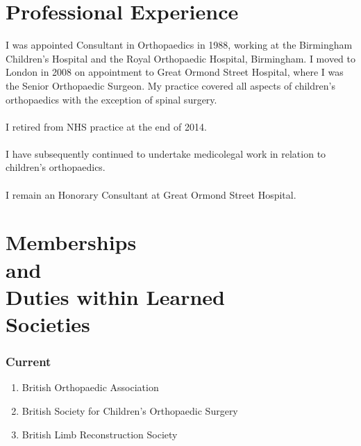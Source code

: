 \documentclass[margin,line]{res}
\begin{document}
\begin{resume}
\section{\sc Professional Experience}
\noindent{}I was appointed Consultant in Orthopaedics in 1988, working at the Birmingham Children's Hospital and the Royal Orthopaedic Hospital, Birmingham. I  moved  to  London  in  2008  on appointment to  Great  Ormond  Street Hospital, where  I was the Senior Orthopaedic  Surgeon. My practice  covered  all aspects  of children's orthopaedics with the exception of spinal surgery.\\
\\
I retired from NHS practice at the end of 2014.\\
\\
I have subsequently continued to undertake medicolegal work in relation to children's orthopaedics.\\
\\
I remain an Honorary Consultant at Great Ormond Street Hospital. 

\section{\sc Memberships \\ and \\ Duties within Learned \\ Societies}
\vspace{-0.2in}
\noindent{}\subsubsection{Current}
\begin{enumerate}
\item British Orthopaedic Association
\item British Society for Children's Orthopaedic Surgery
\item British Limb Reconstruction Society 
\end{enumerate}

\end{resume}
\end{document}
